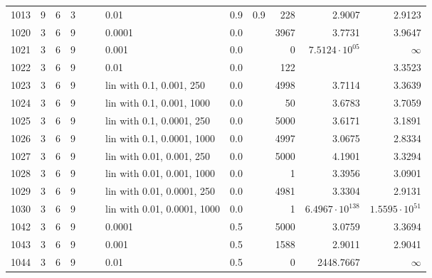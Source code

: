 \begin{longtable}{lrrrrrlrrrrr}
 1013 &       9 & 6 & 3 &   &   &                        0.01 &      0.9 &    0.9 &     228 &                 2.9007 &                 2.9123 \\
 1020 &       3 & 6 & 9 &   &   &                      0.0001 &      0.0 &        &    3967 &                 3.7731 &                 3.9647 \\
 1021 &       3 & 6 & 9 &   &   &                       0.001 &      0.0 &        &       0 &  $7.5124\cdot 10^{05}$ &               $\infty$ \\
 1022 &       3 & 6 & 9 &   &   &                        0.01 &      0.0 &        &     122 &                        &                 3.3523 \\
 1023 &       3 & 6 & 9 &   &   &    lin with 0.1, 0.001, 250 &      0.0 &        &    4998 &                 3.7114 &                 3.3639 \\
 1024 &       3 & 6 & 9 &   &   &   lin with 0.1, 0.001, 1000 &      0.0 &        &      50 &                 3.6783 &                 3.7059 \\
 1025 &       3 & 6 & 9 &   &   &   lin with 0.1, 0.0001, 250 &      0.0 &        &    5000 &                 3.6171 &                 3.1891 \\
 1026 &       3 & 6 & 9 &   &   &  lin with 0.1, 0.0001, 1000 &      0.0 &        &    4997 &                 3.0675 &                 2.8334 \\
 1027 &       3 & 6 & 9 &   &   &   lin with 0.01, 0.001, 250 &      0.0 &        &    5000 &                 4.1901 &                 3.3294 \\
 1028 &       3 & 6 & 9 &   &   &  lin with 0.01, 0.001, 1000 &      0.0 &        &       1 &                 3.3956 &                 3.0901 \\
 1029 &       3 & 6 & 9 &   &   &  lin with 0.01, 0.0001, 250 &      0.0 &        &    4981 &                 3.3304 &                 2.9131 \\
 1030 &       3 & 6 & 9 &   &   & lin with 0.01, 0.0001, 1000 &      0.0 &        &       1 & $6.4967\cdot 10^{138}$ &  $1.5595\cdot 10^{51}$ \\
 1042 &       3 & 6 & 9 &   &   &                      0.0001 &      0.5 &        &    5000 &                 3.0759 &                 3.3694 \\
 1043 &       3 & 6 & 9 &   &   &                       0.001 &      0.5 &        &    1588 &                 2.9011 &                 2.9041 \\
 1044 &       3 & 6 & 9 &   &   &                        0.01 &      0.5 &        &       0 &              2448.7667 &               $\infty$ \\

\end{longtable}
